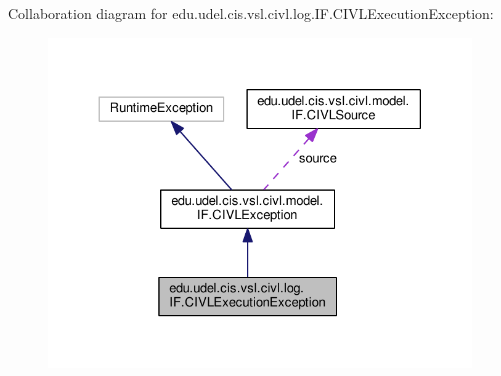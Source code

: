 Collaboration diagram for edu.\+udel.\+cis.\+vsl.\+civl.\+log.\+I\+F.\+C\+I\+V\+L\+Execution\+Exception\+:
\nopagebreak
\begin{figure}[H]
\begin{center}
\leavevmode
\includegraphics[width=330pt]{classedu_1_1udel_1_1cis_1_1vsl_1_1civl_1_1log_1_1IF_1_1CIVLExecutionException__coll__graph}
\end{center}
\end{figure}
